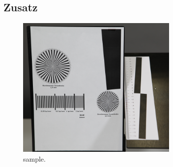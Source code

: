 \subsection{Zusatz}\label{subsec:Zusatz}

\begin{figure}[ht]
	\centering
	\includegraphics[width=0.7\textwidth]{bilder/testbild.png}
	\caption{sample.\cite{WWU}}
	\label{fig:testbild}	
\end{figure}	